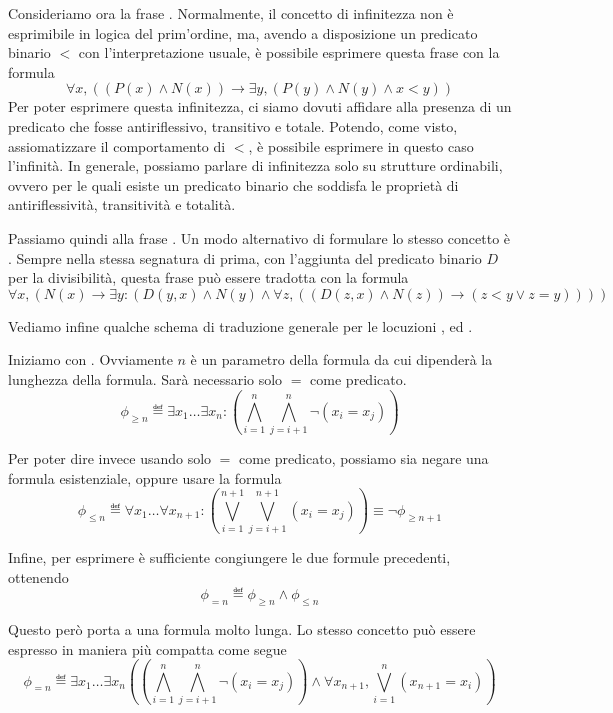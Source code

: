 Consideriamo ora la frase . Normalmente, il concetto di infinitezza non è esprimibile in logica del prim'ordine, ma, avendo a disposizione un predicato binario \(<\) con l'interpretazione usuale, è possibile esprimere questa frase con la formula
\[\forall x,( (P(x) \land N(x)) \to \exists y, (P(y) \land N(y) \land x<y))\]
Per poter esprimere questa infinitezza, ci siamo dovuti affidare alla presenza di un predicato che fosse antiriflessivo, transitivo e totale. Potendo, come visto, assiomatizzare il comportamento di \(<\), è possibile esprimere in questo caso l'infinità. In generale, possiamo parlare di infinitezza solo su strutture ordinabili, ovvero per le quali esiste un predicato binario che soddisfa le proprietà di antiriflessività, transitività e totalità.

Passiamo quindi alla frase . Un modo alternativo di formulare lo stesso concetto è . Sempre nella stessa segnatura di prima, con l'aggiunta del predicato binario \(D\) per la divisibilità, questa frase può essere tradotta con la formula
\[\forall x, (N(x) \to \exists y: (D(y,x) \land N(y) \land \forall z, ((D(z,x) \land N(z)) \to (z < y \lor z = y))))\]

Vediamo infine qualche schema di traduzione generale per le locuzioni ,  ed .

Iniziamo con . Ovviamente \(n\) è un parametro della formula da cui dipenderà la lunghezza della formula. Sarà necessario solo \(=\) come predicato.
\[\phi_{\geq n} \eqdef \exists x_1 \dots \exists x_n: (\bigwedge_{i=1}^n \bigwedge_{j=i+1}^n \neg (x_i = x_j))\]

Per poter dire invece  usando solo \(=\) come predicato, possiamo sia negare una formula esistenziale, oppure usare la formula
\[\phi_{\leq n} \eqdef \forall x_1 \dots \forall x_{n+1}: (\bigvee_{i=1}^{n+1} \bigvee_{j=i+1}^{n+1} (x_i = x_j))\equiv \neg \phi_{\geq n+1}\]

Infine, per esprimere  è sufficiente congiungere le due formule precedenti, ottenendo
\[\phi_{= n} \eqdef \phi_{\geq n} \land \phi_{\leq n}\]

Questo però porta a una formula molto lunga. Lo stesso concetto può essere espresso in maniera più compatta come segue
\[\phi_{= n} \eqdef \exists x_1 \dots \exists x_n ((\bigwedge_{i=1}^n \bigwedge_{j=i+1}^n \neg (x_i = x_j)) \land \forall x_{n+1}, \bigvee_{i=1}^{n} (x_{n+1} = x_i) )\]
